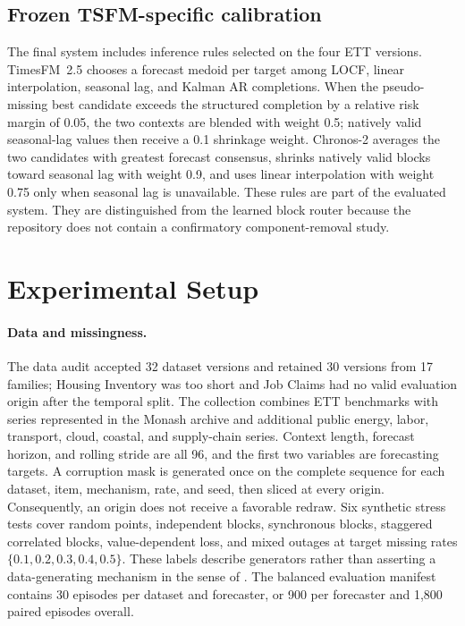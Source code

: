 \documentclass{article}
\begin{document}
\subsection{Frozen TSFM-specific calibration}
\label{sec:calibration}

The final system includes inference rules selected on the four ETT versions. TimesFM~2.5 chooses a forecast medoid per target among LOCF, linear interpolation, seasonal lag, and Kalman AR completions. When the pseudo-missing best candidate exceeds the structured completion by a relative risk margin of 0.05, the two contexts are blended with weight 0.5; natively valid seasonal-lag values then receive a 0.1 shrinkage weight. Chronos-2 averages the two candidates with greatest forecast consensus, shrinks natively valid blocks toward seasonal lag with weight 0.9, and uses linear interpolation with weight 0.75 only when seasonal lag is unavailable. These rules are part of the evaluated system. They are distinguished from the learned block router because the repository does not contain a confirmatory component-removal study.

\section{Experimental Setup}
\label{sec:experiments}

\paragraph{Data and missingness.}
The data audit accepted 32 dataset versions and retained 30 versions from 17 families; Housing Inventory was too short and Job Claims had no valid evaluation origin after the temporal split. The collection combines ETT benchmarks \citep{zhou2021informer} with series represented in the Monash archive \citep{godahewa2021monash} and additional public energy, labor, transport, cloud, coastal, and supply-chain series. Context length, forecast horizon, and rolling stride are all 96, and the first two variables are forecasting targets. A corruption mask is generated once on the complete sequence for each dataset, item, mechanism, rate, and seed, then sliced at every origin. Consequently, an origin does not receive a favorable redraw. Six synthetic stress tests cover random points, independent blocks, synchronous blocks, staggered correlated blocks, value-dependent loss, and mixed outages at target missing rates $\{0.1,0.2,0.3,0.4,0.5\}$. These labels describe generators rather than asserting a data-generating mechanism in the sense of \citet{rubin1976inference}. The balanced evaluation manifest contains 30 episodes per dataset and forecaster, or 900 per forecaster and 1,800 paired episodes overall.
\end{document}

